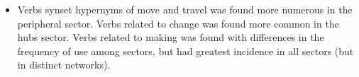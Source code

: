 \begin{itemize}
																																																																																																																																																																																																																																																																																																																																																																										\FloatBarrier
																																																																																																																																																																																																																																																																																																																																																																											\item Verbs synset hypernyms of move and travel was found more numerous in the peripheral sector.
																																																																																																																																																																																																																																																																																																																																																																													Verbs related to change was found more common in the hubs sector.
																																																																																																																																																																																																																																																																																																																																																																															Verbs related to making was found with differences in the frequency of use among sectors,
																																																																																																																																																																																																																																																																																																																																																																																	but had greatest incidence in all sectors (but in distinct networks).

\end{itemize}
